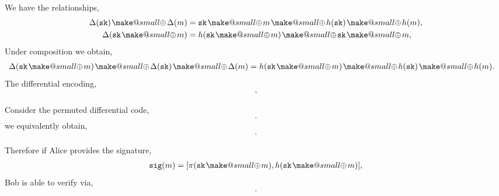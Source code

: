 \documentclass[twocolumn, aps, amsmath, amssymb, nofootinbib, superscriptaddress, longbibliography, doublefloatfix, table-of-contents, eqsecnum, rmp]{revtex4-2}
\makeatletter
\newcommand{\soplus}{{{\hspace{1pt}}{\mathbin{\mathpalette\make@small\oplus}}}{\hspace{1pt}}}
\newcommand{\make@small}[2]{%
  \vcenter{\hbox{%
    \scalebox{0.6}{$\m@th#1#2$}%
  }}%
}
\makeatother
\begin{document}
We have the relationships,
\begin{align}
	\Delta(\mathtt{sk}) \soplus \Delta(m) &= \mathtt{sk} \soplus m \soplus h(\texttt{sk}) \soplus h(m),\nonumber\\
	\Delta(\mathtt{sk} \soplus m)	 &= h(\mathtt{sk} \soplus m) \soplus \mathtt{sk} \soplus m,\nonumber\\
\end{align}
Under composition we obtain,
\begin{align}
	\Delta(\mathtt{sk} \soplus m)	 \soplus \Delta(\mathtt{sk}) \soplus \Delta(m) &= h(\mathtt{sk} \soplus m) \soplus h(\mathtt{sk}) \soplus h(m).	
\end{align}
The differential encoding,
\begin{align}
	[h(\mathtt{sk}\soplus m), \Delta(\mathtt{sk} \soplus m)],
\end{align}

Consider the permuted differential code,
\begin{align}
	[\pi(\mathtt{sk}\soplus m), \pi(\Delta(\mathtt{sk})) \soplus \pi(\Delta(m))].
\end{align}
we equivalently obtain,
\begin{align}
	[\Delta(\mathtt{sk} \soplus m) \soplus h(\mathtt{sk} \soplus m), \Delta(\mathtt{sk}) \soplus \Delta(m)].
\end{align}

Therefore if Alice provides the signature,
\begin{align}
	\mathtt{sig}(m) = [\pi(\mathtt{sk} \soplus m), h(\mathtt{sk} \soplus m)],
\end{align}	
Bob is able to verify via,
\begin{align}
		[\mathtt{sig}(m),\Delta(\mathtt{sk}) \soplus \Delta(m)].
\end{align}



%


\end{document}
